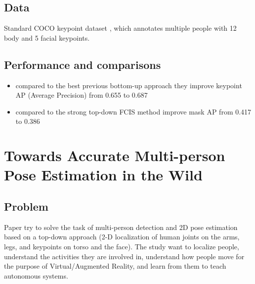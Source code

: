 \documentclass[runningheads,a4paper,11pt]{report}
\begin{document}
\subsection{Data}
Standard COCO keypoint dataset \cite{coco2016} , which annotates multiple people with 12 body and 5 facial keypoints.

\subsection{Performance and comparisons}
\begin{itemize}
    \item compared to the best previous bottom-up approach they improve keypoint AP (Average Precision) from 0.655 to 0.687
    \item compared to the strong top-down FCIS method \cite{DBLP:journals/corr/LiQDJW16} improve mask AP from 0.417 to 0.386
\end{itemize}


\section{Towards Accurate Multi-person Pose Estimation in the Wild
\cite{DBLP:journals/corr/PapandreouZKTTB17}}

\subsection{Problem}
\par Paper try to solve the task of multi-person detection and 2D pose estimation based on a top-down approach (2-D localization of human joints on the arms, legs, and keypoints on torso and the face).
The study want to localize people, understand the activities they are involved in, understand how people move for the purpose of Virtual/Augmented Reality, and learn from them to teach autonomous systems.
\end{document}
